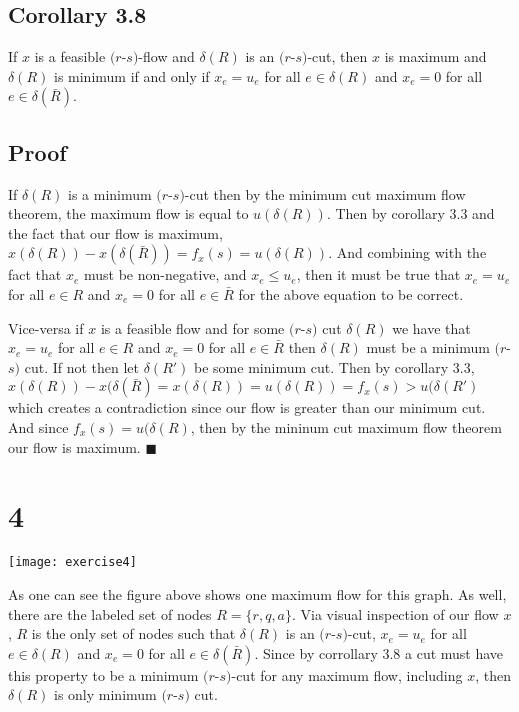 \documentclass[]{article}
\newcommand*{\QEDA}{\hfill\ensuremath{\blacksquare}}%
\begin{document}
\subsection*{Corollary 3.8}	
If $x$ is a feasible $(r$-$s)$-flow and $\delta(R)$ is an $(r$-$s)$-cut, then $x$ is maximum and $\delta(R)$ is minimum if and only if
$x_e = u_e$ for all $e \in \delta(R)$ and $x_e = 0$ for all $e \in \delta(\bar{R})$.
\subsection*{Proof}
If $\delta(R)$ is a minimum $(r$-$s)$-cut then by the minimum cut maximum flow theorem, the maximum flow is equal to $u(\delta(R))$.  
Then by corollary 3.3 and the fact that our flow is maximum, $x(\delta(R)) - x(\delta(\bar{R})) = f_x(s) = u(\delta(R))$. And combining with the fact that $x_e$ must be non-negative, and $x_e \leq u_e$, then it must be true that $x_e = u_e$ for all $e \in R$ and $x_e = 0$ for all $e \in \bar{R}$ for the above equation to be correct.

Vice-versa if $x$ is a feasible flow and for some $(r$-$s)$ cut $\delta(R)$ we have that $x_e = u_e$ for all $e \in R$ and $x_e = 0$ for all $e \in \bar{R}$ then $\delta(R)$ must be a minimum $(r$-$s)$ cut. If not then let $\delta(R')$ be some minimum cut. Then by corollary 3.3, $x(\delta(R)) - x(\delta(\bar{R}) = x(\delta(R)) = u(\delta(R)) = f_x(s) > u(\delta(R')$ which creates a contradiction since our flow is greater than our minimum cut. And since $f_x(s) = u(\delta(R)$, then by the mininum cut maximum flow theorem our flow is maximum.
\QEDA

\section*{4}
\texttt{[image: exercise4]}

As one can see the figure above shows one maximum flow for this graph. As well, there are the labeled set of nodes $R = \{r,q,a\}$. Via visual inspection of our flow $x$, $R$ is the only set of nodes such that $\delta(R)$ is an $(r$-$s)$-cut, $x_e = u_e$ for all $e \in \delta(R)$ and $x_e = 0 $ for all $e \in \delta(\bar{R})$. Since by corrollary 3.8 a cut must have this property to be a minimum $(r$-$s)$-cut for any maximum flow, including $x$, then $\delta(R)$ is only minimum $(r$-$s)$ cut.  
\end{document}
